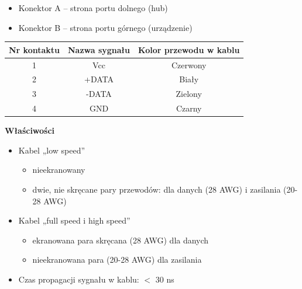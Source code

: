 			\begin{itemize}
				\item Konektor A – strona portu dolnego (hub)
				\item Konektor B – strona portu górnego (urządzenie)
			\end{itemize}
			\begin{table}[h]
				\begin{tabular}{|c|c|c|}
					\hline
					\textbf{Nr kontaktu}	& \textbf{Nazwa sygnału}	& \textbf{Kolor przewodu w kablu} \\ \hline
					1 						& Vcc						& Czerwony		\\ \hline
					2 						& +DATA						& Biały			\\ \hline
					3 						& -DATA						& Zielony		\\ \hline
					4 						& GND						& Czarny		\\ \hline
				\end{tabular}
			\end{table}
			\textbf{Właściwości}
			\begin{itemize}
				\item Kabel „low speed”
				\begin{itemize}
					\item nieekranowany
					\item dwie, nie skręcane pary przewodów: dla danych (28 AWG) i zasilania (20-28 AWG)
				\end{itemize}
				\item Kabel „full speed i high speed”
				\begin{itemize}
					\item ekranowana para skręcana (28 AWG) dla danych
					\item nieekranowana para (20-28 AWG) dla zasilania
				\end{itemize}
				\item Czas propagacji sygnału w kablu: $<$ 30 ns
			\end{itemize}
